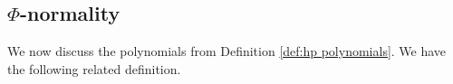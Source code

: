 \documentclass[reqno,centertags,11pt,draft]{amsart}
\newtheorem{thm}{Theorem}[section]
\newtheorem{defn}[thm]{Definition}
\newcommand{\bbT}{\mathbb{\partial\mathbb{D}}}
\newcommand{\N}{\mathbb{N}}
\newcommand{\T}{\mathbb{\partial\mathbb{D}}}
\newcommand{\calM}{{\mathcal M}}
\newcommand{\calN}{{\mathcal N}}
\newcommand{\la}{\left\langle}
\newcommand{\ra}{\right\rangle}
\begin{document}

		

\subsection{$\Phi$-normality}

We now discuss the polynomials from Definition \ref{def:hp polynomials}. We have the following related definition. 
\end{document}
